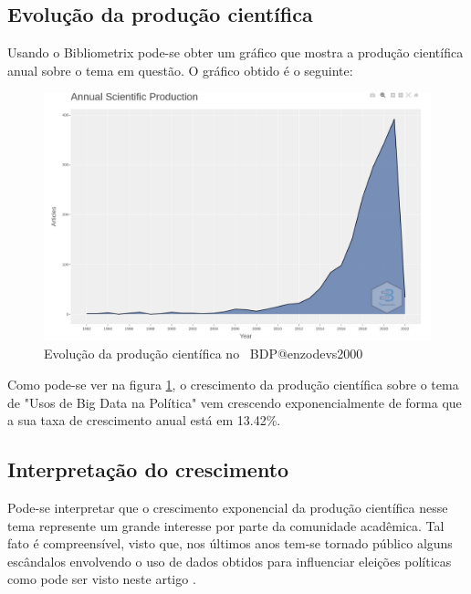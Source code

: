 \subsection{Evolução da produção científica}

Usando o Bibliometrix pode-se obter um gráfico que mostra a produção científica anual sobre o tema em questão. O gráfico obtido é o seguinte:

\begin{figure}[H]
    \centering
    \includegraphics[width=1\textwidth]{experiments/enzodevs2000/AnaliseBibliometrica/BigDataInPolicy/Figures/Graficos/evolution.png}
    \caption{Evolução da produção científica no \dataset\   BDP@enzodevs2000}
    \label{fig:enzodevs2000:BDP:evol}
\end{figure}

Como pode-se ver na figura \ref{fig:enzodevs2000:BDP:evol}, o crescimento da produção científica sobre o tema de "Usos de Big Data na Política" vem crescendo exponencialmente de forma que a sua taxa de crescimento anual está em 13.42\%.

\subsection{Interpretação do crescimento \label{enzodevs2000:interpret_cresc}}

Pode-se interpretar que o crescimento exponencial da produção científica nesse tema represente um grande interesse por parte da comunidade acadêmica. Tal fato é compreensível, visto que, nos últimos anos tem-se tornado público alguns escândalos envolvendo o uso de dados obtidos para influenciar eleições políticas como pode ser visto neste artigo \citet{wikipedia_escandalo_nodate}.

